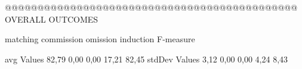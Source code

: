 @@@@@@@@@@@@@@@@@@@@@@@@@@@@@@@@@@@@@@@@@@@@@ OVERALL OUTCOMES

               matching commission   omission  induction  F-measure
               
avg Values      82,79      0,00       0,00      17,21     82,45        
stdDev Values    3,12       0,00       0,00       4,24      8,43        